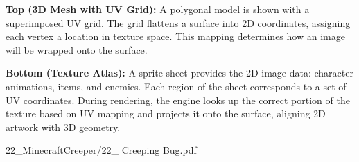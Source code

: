 \begin{SideNotePage}{
  \textbf{Top (3D Mesh with UV Grid):} A polygonal model is shown with a superimposed UV grid. The grid flattens a surface into 2D coordinates, assigning each vertex a location in texture space. This mapping determines how an image will be wrapped onto the surface. \par
  \textbf{Bottom (Texture Atlas):} A sprite sheet provides the 2D image data: character animations, items, and enemies. Each region of the sheet corresponds to a set of UV coordinates. During rendering, the engine looks up the correct portion of the texture based on UV mapping and projects it onto the surface, aligning 2D artwork with 3D geometry. \par

}{22_MinecraftCreeper/22_ Creeping Bug.pdf}
\end{SideNotePage}
